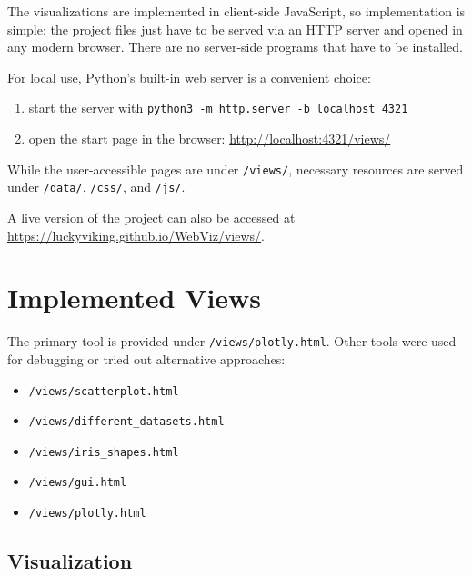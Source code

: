 \documentclass{scrartcl}
\begin{document}
The visualizations are implemented in client-side JavaScript,
so implementation is simple:
the project files just have to be served via an HTTP server
and opened in any modern browser.
There are no server-side programs that have to be installed.

For local use, Python's built-in web server is a convenient choice:

\begin{enumerate}
\item start the server with \verb|python3 -m http.server -b localhost 4321|
\item open the start page in the browser: \url{http://localhost:4321/views/}
\end{enumerate}

While the user-accessible pages are under \verb|/views/|,
necessary resources are served under
\verb|/data/|, \verb|/css/|, and \verb|/js/|.

A live version of the project can also be accessed at
\url{https://luckyviking.github.io/WebViz/views/}.



\section{Implemented Views}

The primary tool is provided under \verb|/views/plotly.html|.
Other tools were used for debugging or tried out alternative approaches:

\begin{itemize}
\item \verb|/views/scatterplot.html|
\item \verb|/views/different_datasets.html|
\item \verb|/views/iris_shapes.html|
\item \verb|/views/gui.html|
\item \verb|/views/plotly.html|
\end{itemize}

\subsection*{Visualization}
\end{document}

